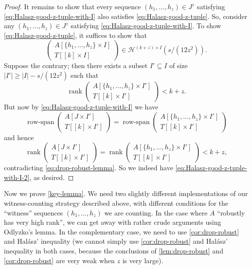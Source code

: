 \documentclass[english]{article}
\theoremstyle{remark}
\numberwithin{equation}{section}
\numberwithin{figure}{section}
\newcommand{\su}{\subseteq}
\newcommand{\mc}{\mathcal}
\newcommand{\on}{\operatorname}
\begin{document}
\begin{proof}
    It remains to show that every sequence $(h_1,\dots,h_z)\in J^z$ satisfying \cref{eq:Halasz-good-z-tuple-with-I} also satisfies \cref{eq:Halasz-good-z-tuple}. So, consider any $(h_1,\dots,h_z)\in J^z$ satisfying \cref{eq:Halasz-good-z-tuple-with-I}. To show \cref{eq:Halasz-good-z-tuple}, it suffices to show that
    \begin{equation}\label{eq:Halasz-good-z-tuple-with-I-2}
    \begin{pmatrix}A[\{h_{1},\dots,h_{z}\}\times I]\\
    T[[k]\times I]
    \end{pmatrix}\in \mc H^{(k+z)\times I}(s/(12z^2)).
    \end{equation}
    Suppose the contrary; then there exists a subset $I'\su I$ of size $|I'|\ge |I|-s/(12z^2)$ such that
    \[\on{rank} \begin{pmatrix}A[\{h_{1},\dots,h_{z}\}\times I']\\
    T[[k]\times I']
    \end{pmatrix}<k+z.\]
    But now by \cref{eq:Halasz-good-z-tuple-with-I} we have
    \[\on{row-span}\begin{pmatrix}A[J\times I']\\
    T[[k]\times I']
    \end{pmatrix}
    =\on{row-span}\begin{pmatrix}A[\{h_{1},\dots,h_{z}\}\times I']\\
    T[[k]\times I']
    \end{pmatrix}\]
    and hence
    \[\on{rank} \begin{pmatrix}A[J\times I']\\
    T[[k]\times I']
    \end{pmatrix}
    =\on{rank} \begin{pmatrix}A[\{h_{1},\dots,h_{z}\}\times I']\\
    T[[k]\times I']
    \end{pmatrix}<k+z,\]
    contradicting \cref{eq:drop-robust-lemma}. So we indeed have \cref{eq:Halasz-good-z-tuple-with-I-2}, as desired.
\end{proof}


Now we prove \cref{key-lemma}. We need two slightly different implementations of our witness-counting strategy described above, with different conditions for the ``witness'' sequences $(h_1,\dots,h_z)$ we are counting. In the case where $A$ ``robustly has very high rank'', we can get away with rather crude arguments using Odlyzko's lemma. In the complementary case,
we need to use \cref{cor:drop-robust} and Hal\'asz' inequality (we cannot simply use \cref{cor:drop-robust} and Hal\'asz' inequality in both cases, because the conclusions of \cref{lem:drop-robust} and \cref{cor:drop-robust} are very weak when $z$ is very large).
\end{document}
